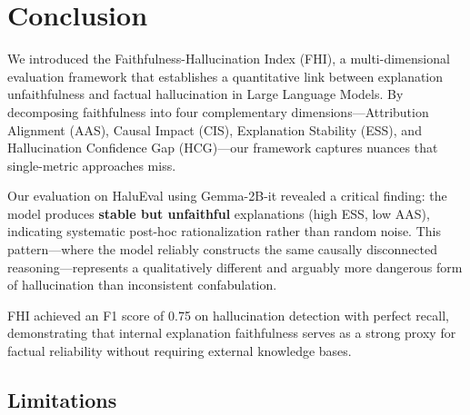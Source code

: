 \section{Conclusion}
\label{sec:conclusion}

We introduced the Faithfulness-Hallucination Index (FHI), a multi-dimensional evaluation framework that establishes a quantitative link between explanation unfaithfulness and factual hallucination in Large Language Models. By decomposing faithfulness into four complementary dimensions---Attribution Alignment (AAS), Causal Impact (CIS), Explanation Stability (ESS), and Hallucination Confidence Gap (HCG)---our framework captures nuances that single-metric approaches miss.

Our evaluation on HaluEval using Gemma-2B-it revealed a critical finding: the model produces \textbf{stable but unfaithful} explanations (high ESS, low AAS), indicating systematic post-hoc rationalization rather than random noise. This pattern---where the model reliably constructs the same causally disconnected reasoning---represents a qualitatively different and arguably more dangerous form of hallucination than inconsistent confabulation.

FHI achieved an F1 score of 0.75 on hallucination detection with perfect recall, demonstrating that internal explanation faithfulness serves as a strong proxy for factual reliability without requiring external knowledge bases.

\subsection{Limitations}

